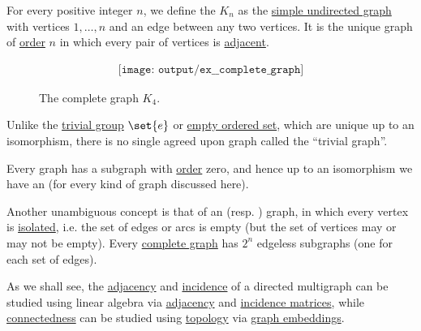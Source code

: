 \begin{example}\label{ex:complete_graph}
  For every positive integer \( n \), we define the  \( K_n \) as the \hyperref[def:undirected_graph]{simple undirected graph} with vertices \( 1, \ldots, n \) and an edge between any two vertices. It is the unique graph of \hyperref[def:graph_cardinality/order]{order} \( n \) in which every pair of vertices is \hyperref[def:graph_adjacency]{adjacent}.

  \begin{figure}[!ht]
    \begin{equation}\label{eq:fig:ex:complete_graph}
      \begin{aligned}
        \texttt{[image: output/ex\_\_complete\_graph]}
      \end{aligned}
    \end{equation}
    \caption{The complete graph \( K_4 \).}\label{fig:ex:complete_graph}
  \end{figure}
\end{example}

\begin{remark}\label{rem:trivial_graph}
  Unlike the \hyperref[def:group/trivial]{trivial group} \( \set{ e } \) or \hyperref[def:preordered_set/trivial]{empty ordered set}, which are unique up to an isomorphism, there is no single agreed upon graph called the \enquote{trivial graph}.

  Every graph has a subgraph with \hyperref[def:graph_cardinality/order]{order} zero, and hence up to an isomorphism we have an  (for every kind of graph discussed here).

  Another unambiguous concept is that of an  (resp. ) graph, in which every vertex is \hyperref[def:isolated_vertex]{isolated}, i.e. the set of edges or arcs is empty (but the set of vertices may or may not be empty). Every \hyperref[ex:complete_graph]{complete graph} has \( 2^n \) edgeless subgraphs (one for each set of edges).
\end{remark}

\begin{remark}\label{rem:graphs_linear_algebra_and_topology}
  As we shall see, the \hyperref[def:graph_adjacency]{adjacency} and \hyperref[def:graph_incidence]{incidence} of a directed multigraph can be studied using linear algebra via \hyperref[def:graph_adjacency_matrix]{adjacency} and \hyperref[def:directed_incidence_matrix]{incidence matrices}, while \hyperref[def:graph_connectedness]{connectedness} can be studied using \hyperref[def:graph_connectedness]{topology} via \hyperref[def:graph_geometric_realization/embedding]{graph embeddings}.
\end{remark}

